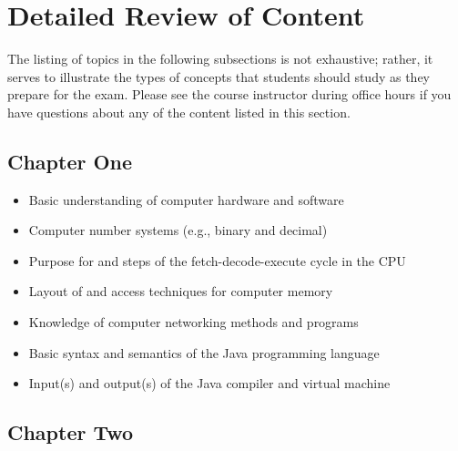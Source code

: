 \vspace*{-.15in}
\section*{Detailed Review of Content}
\vspace*{-.1in}

The listing of topics in the following subsections is not exhaustive; rather, it serves to illustrate the types of
concepts that students should study as they prepare for the exam. Please see the course instructor during office hours
if you have questions about any of the content listed in this section.

\vspace*{-.1in}
\subsection*{Chapter One}

\begin{itemize}

  \itemsep 0in
  \item Basic understanding of computer hardware and software
  \item Computer number systems (e.g., binary and decimal)
  \item Purpose for and steps of the fetch-decode-execute cycle in the CPU
  \item Layout of and access techniques for computer memory
  \item Knowledge of computer networking methods and programs
  \item Basic syntax and semantics of the Java programming language
  \item Input(s) and output(s) of the Java compiler and virtual machine

\end{itemize}

\vspace*{-.2in}
\subsection*{Chapter Two}
\vspace*{-.1in}

